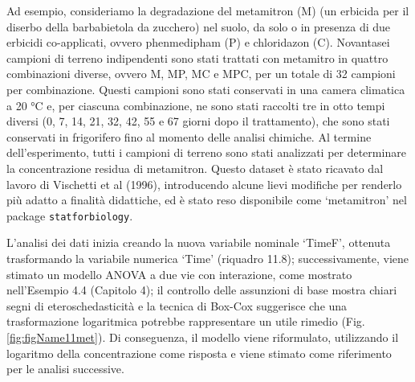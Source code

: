 \documentclass[
  12pt,
]{book}
\begin{document}
Ad esempio, consideriamo la degradazione del metamitron (M) (un erbicida per il diserbo della barbabietola da zucchero) nel suolo, da solo o in presenza di due erbicidi co-applicati, ovvero phenmedipham (P) e chloridazon (C). Novantasei campioni di terreno indipendenti sono stati trattati con metamitro in quattro combinazioni diverse, ovvero M, MP, MC e MPC, per un totale di 32 campioni per combinazione. Questi campioni sono stati conservati in una camera climatica a 20 °C e, per ciascuna combinazione, ne sono stati raccolti tre in otto tempi diversi (0, 7, 14, 21, 32, 42, 55 e 67 giorni dopo il trattamento), che sono stati conservati in frigorifero fino al momento delle analisi chimiche. Al termine dell'esperimento, tutti i campioni di terreno sono stati analizzati per determinare la concentrazione residua di metamitron. Questo dataset è stato ricavato dal lavoro di Vischetti et al (1996), introducendo alcune lievi modifiche per renderlo più adatto a finalità didattiche, ed è stato reso disponibile come `metamitron' nel package \texttt{statforbiology}.

L'analisi dei dati inizia creando la nuova variabile nominale `TimeF', ottenuta trasformando la variabile numerica `Time' (riquadro 11.8); successivamente, viene stimato un modello ANOVA a due vie con interazione, come mostrato nell'Esempio 4.4 (Capitolo 4); il controllo delle assunzioni di base mostra chiari segni di eteroschedasticità e la tecnica di Box-Cox suggerisce che una trasformazione logaritmica potrebbe rappresentare un utile rimedio (Fig. \ref{fig:figName11met}). Di conseguenza, il modello viene riformulato, utilizzando il logaritmo della concentrazione come risposta e viene stimato come riferimento per le analisi successive.

\small
\vspace{12pt}
\end{document}
